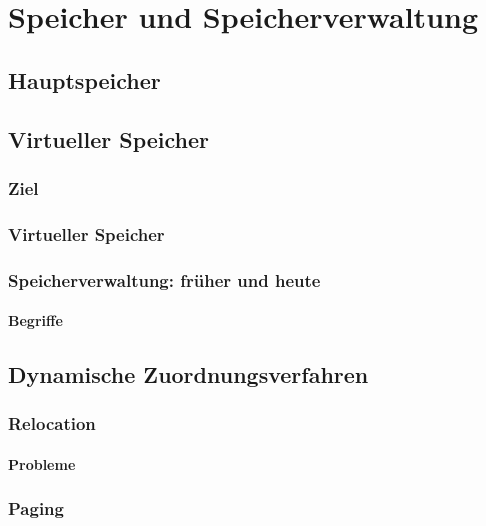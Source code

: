 \chapter{Speicher und Speicherverwaltung}
\section*{Hauptspeicher}
\section{Virtueller Speicher}
\subsection{Ziel}
\subsection{Virtueller Speicher}
\subsection{Speicherverwaltung: früher und heute}
\subsubsection{Begriffe}

\section{Dynamische Zuordnungsverfahren}
\subsection{Relocation}
\subsubsection{Probleme}
\subsection{Paging}
